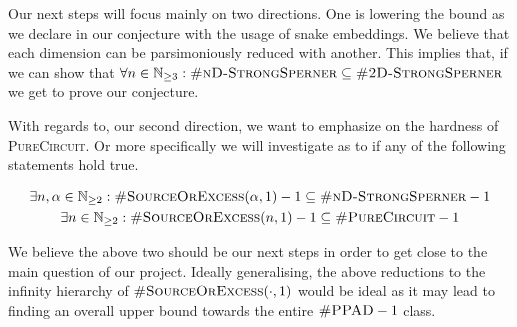 Our next steps will focus mainly on two directions. One is lowering the bound as we declare in our conjecture with the
usage of snake embeddings. We believe that each dimension can be parsimoniously reduced with another. This implies
that, if we can show that $\forall n \in \mathbb{N}_{\geq 3}: \textsc{\#nD-StrongSperner} \subseteq \textsc{\#2D-StrongSperner}$
we get to prove our conjecture.


With regards to, our second direction, we want to emphasize on the hardness of \textsc{PureCircuit}.
Or more specifically we will investigate as to if any of the following statements hold true.

\begin{gather*}
    \exists n, \alpha \in \mathbb{N}_{\geq 2}:
    \textsc{\#SourceOrExcess}(\alpha,1) - 1  \subseteq \textsc{\#nD-StrongSperner} -1 \\
    \exists n \in \mathbb{N}_{\geq 2}: \textsc{\#SourceOrExcess}(n,1) - 1 \subseteq \textsc{\#PureCircuit} -1 \\
\end{gather*}

We believe the above two should be our next steps in order to get close to the main question of our project.
Ideally generalising, the above reductions to the infinity hierarchy of
$\textsc{\#SourceOrExcess}(\cdot,1)$ would be ideal as it may lead to finding an overall upper bound
towards the entire $\textsc{\#PPAD} -1$ class.

